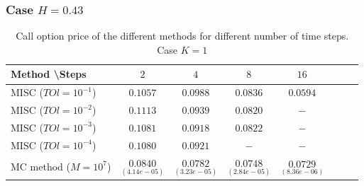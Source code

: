 \documentclass[11pt]{article}
\begin{document}
\subsubsection*{Case $H=0.43$}
\begin{table}[h!]
	\centering
	\begin{tabular}{l*{6}{c}r}
		Method \textbackslash  Steps            & $2$ & $4$ & $8$ & $16$  \\
		\hline
		MISC ($TOl=10^{-1}$)  & $0.1057$ & $0.0988$ & $0.0836$ & $0.0594$  \\
		MISC ($TOl=10^{-2}$)  & $0.1113$ & $0.0939$ & $0.0820$ & $-$  \\
		MISC ($TOl=10^{-3}$)        & $0.1081$ &$0.0918$ &  $0.0822$ &  $-$ \\
		MISC ($TOl=10^{-4}$)    & $0.1080$ & $0.0921$  & $-$ & $-$  \\
		MC method ($M=10^{7}$)   & $\underset{(4.14e-05)}{0.0840}$ & $ \underset{(3.23e-05)}{0.0782}$  & $ \underset{(2.84e-05)}{0.0748}$ & $ \underset{(8.36e-06)}{0.0729}$ \\		
		
		\hline
	\end{tabular}
	\caption{ Call option price of the different methods for different number of time steps. Case $K=1$}
	\label{table: Call option price of the different methods for different number of time steps. Case $K=1$}
\end{table}

%
\end{document}
